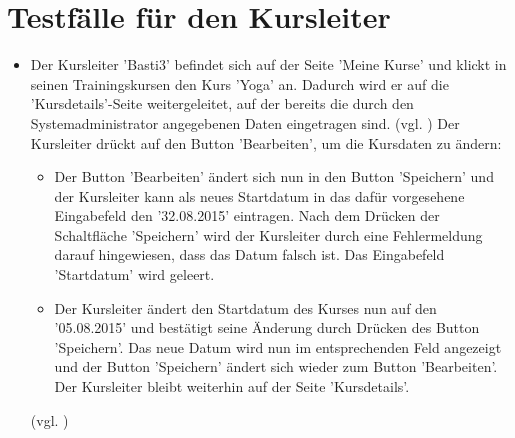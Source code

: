 \documentclass[a4paper]{scrreprt}
\newcounter{Lc}
\newcounter{Hc}
\newcommand{\stepHc}{\stepcounter{Hc}\setcounter{Lc}{0}}
\begin{document}
	\section{Testfälle für den Kursleiter}
		\stepHc
		\begin{itemize}
			\item {} 
			Der Kursleiter 'Basti3' befindet sich auf der Seite 'Meine Kurse' und klickt in seinen Trainingskursen den Kurs 'Yoga' an. Dadurch wird er auf die 'Kursdetails'-Seite weitergeleitet, auf der bereits die durch den Systemadministrator angegebenen Daten eingetragen sind. (vgl. ) Der Kursleiter drückt auf den Button 'Bearbeiten', um die Kursdaten zu ändern:
			\begin{itemize}
				\item Der Button 'Bearbeiten' ändert sich nun in den Button 'Speichern' und der Kursleiter kann als neues Startdatum in das dafür vorgesehene Eingabefeld den '32.08.2015' eintragen. Nach dem Drücken der Schaltfläche 'Speichern' wird der Kursleiter durch eine Fehlermeldung darauf hingewiesen, dass das Datum falsch ist. Das Eingabefeld 'Startdatum' wird geleert.
				
				\item Der Kursleiter ändert den Startdatum des Kurses nun auf den '05.08.2015' und bestätigt seine Änderung durch Drücken des Button 'Speichern'. Das neue Datum wird nun im entsprechenden Feld angezeigt und der Button 'Speichern' ändert sich wieder zum Button 'Bearbeiten'. Der Kursleiter bleibt weiterhin auf der Seite 'Kursdetails'.
			\end{itemize}
			(vgl. )
			

\end{itemize}
\end{document}

